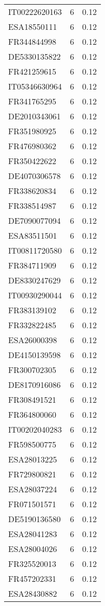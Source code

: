 \begin{table*}[htbp]
\begin{tabular}{lrr}
IT00222620163 & 6 & 0.12 \\
ESA18550111 & 6 & 0.12 \\
FR344844998 & 6 & 0.12 \\
DE5330135822 & 6 & 0.12 \\
FR421259615 & 6 & 0.12 \\
IT05346630964 & 6 & 0.12 \\
FR341765295 & 6 & 0.12 \\
DE2010343061 & 6 & 0.12 \\
FR351980925 & 6 & 0.12 \\
FR476980362 & 6 & 0.12 \\
FR350422622 & 6 & 0.12 \\
DE4070306578 & 6 & 0.12 \\
FR338620834 & 6 & 0.12 \\
FR338514987 & 6 & 0.12 \\
DE7090077094 & 6 & 0.12 \\
ESA83511501 & 6 & 0.12 \\
IT00811720580 & 6 & 0.12 \\
FR384711909 & 6 & 0.12 \\
DE8330247629 & 6 & 0.12 \\
IT00930290044 & 6 & 0.12 \\
FR383139102 & 6 & 0.12 \\
FR332822485 & 6 & 0.12 \\
ESA26000398 & 6 & 0.12 \\
DE4150139598 & 6 & 0.12 \\
FR300702305 & 6 & 0.12 \\
DE8170916086 & 6 & 0.12 \\
FR308491521 & 6 & 0.12 \\
FR364800060 & 6 & 0.12 \\
IT00202040283 & 6 & 0.12 \\
FR598500775 & 6 & 0.12 \\
ESA28013225 & 6 & 0.12 \\
FR729800821 & 6 & 0.12 \\
ESA28037224 & 6 & 0.12 \\
FR071501571 & 6 & 0.12 \\
DE5190136580 & 6 & 0.12 \\
ESA28041283 & 6 & 0.12 \\
ESA28004026 & 6 & 0.12 \\
FR325520013 & 6 & 0.12 \\
FR457202331 & 6 & 0.12 \\
ESA28430882 & 6 & 0.12 \\

\end{tabular}
\end{table*}
